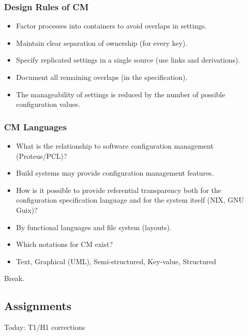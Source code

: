 \begin{frame}
	\frametitle{Design Rules of CM~\cite{burgess2006modeling}}

	\pause

	\begin{itemize} %
	\item Factor processes into containers to avoid overlaps in settings.
	\item Maintain clear separation of ownership (for every key).
	\item Specify replicated settings in a single source (use links and derivations).
	\item Document all remaining overlaps (in the specification).
	\item The manageability of settings is reduced by the number of possible configuration values.
	\end{itemize}
\end{frame}

\begin{frame}
	\frametitle{CM Languages}

	\begin{itemize}[<+-| alert@+>]
	\item What is the relationship to software configuration management (Proteus/PCL)?
	\item[] Build systems may provide configuration management features.
	\item How is it possible to provide referential transparency both for the configuration specification language and for the system itself (NIX, GNU Guix)?
	\item[] By functional languages and file system (layouts).
	\item Which notations for CM exist?
	\item[] Text,  Graphical (UML), Semi-structured, Key-value, Structured
	\end{itemize}
\end{frame}

\begin{assignment}
	\begin{task}
	Break.
	\end{task}
\end{assignment}

\subsection{Assignments}

\begin{assignment}
	Today: T1/H1 corrections
\end{assignment}

